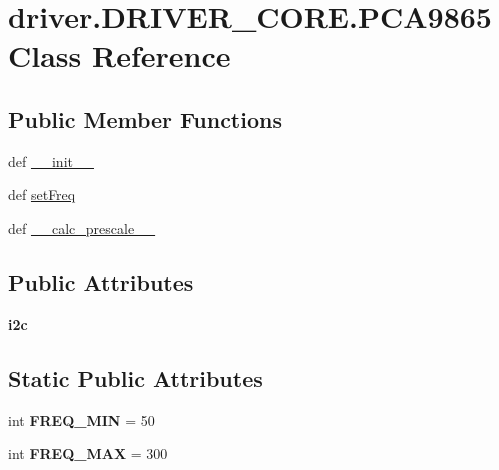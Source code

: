 \hypertarget{classdriver_1_1DRIVER__CORE_1_1PCA9865}{}\section{driver.\+D\+R\+I\+V\+E\+R\+\_\+\+C\+O\+R\+E.\+P\+C\+A9865 Class Reference}
\label{classdriver_1_1DRIVER__CORE_1_1PCA9865}
\subsection*{Public Member Functions}
\begin{DoxyCompactItemize}
\item 
def \hyperlink{classdriver_1_1DRIVER__CORE_1_1PCA9865_ae727575a3372b8b4d90ffa314081c489}{\+\_\+\+\_\+init\+\_\+\+\_\+}
\item 
def \hyperlink{classdriver_1_1DRIVER__CORE_1_1PCA9865_a425edd2aa5693f5fea64d0aec65f77e8}{set\+Freq}
\item 
def \hyperlink{classdriver_1_1DRIVER__CORE_1_1PCA9865_a2482e9c19788095bfc47ebdb62b4903d}{\+\_\+\+\_\+calc\+\_\+prescale\+\_\+\+\_\+}
\end{DoxyCompactItemize}
\subsection*{Public Attributes}
\begin{DoxyCompactItemize}
\item 
\hypertarget{classdriver_1_1DRIVER__CORE_1_1PCA9865_a3a4b2748c61f79822d6602c941535bd2}{}{\bfseries i2c}\label{classdriver_1_1DRIVER__CORE_1_1PCA9865_a3a4b2748c61f79822d6602c941535bd2}

\end{DoxyCompactItemize}
\subsection*{Static Public Attributes}
\begin{DoxyCompactItemize}
\item 
\hypertarget{classdriver_1_1DRIVER__CORE_1_1PCA9865_ad9aef9648195aa00f5ae496992073930}{}int {\bfseries F\+R\+E\+Q\+\_\+\+M\+I\+N} = 50\label{classdriver_1_1DRIVER__CORE_1_1PCA9865_ad9aef9648195aa00f5ae496992073930}

\item 
\hypertarget{classdriver_1_1DRIVER__CORE_1_1PCA9865_a5394eec714130c246fe47c35a2af683a}{}int {\bfseries F\+R\+E\+Q\+\_\+\+M\+A\+X} = 300\label{classdriver_1_1DRIVER__CORE_1_1PCA9865_a5394eec714130c246fe47c35a2af683a}

\end{DoxyCompactItemize}


